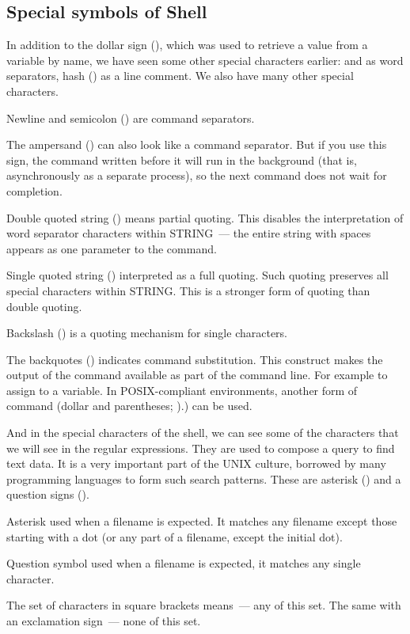 \subsection*{Special symbols of Shell}

In addition to the dollar sign (\struct{\textdollar}), which was used
to retrieve a value from a variable by name, we have seen some other special
characters earlier:  and  as word separators,
hash (\struct{\#}) as a line comment. We also have many other special characters.

Newline and semicolon (\struct{;}) are command separators.

The ampersand (\struct{\&}) can also look like a command separator.
But if you use this sign, the command written before it will run in
the background (that is, asynchronously as a separate process),
so the next command does not wait for completion.

Double quoted string () means partial
quoting. This disables the interpretation of word separator characters within
STRING~--- the entire string with spaces appears as one parameter to the command.

Single quoted string () interpreted as a full quoting.
Such quoting preserves all special characters within STRING.
This is a stronger form of quoting than double quoting.

Backslash (\struct{\textbackslash}) is a quoting mechanism for single characters.

The backquotes (\struct{\textasciigrave}) indicates command substitution.
This construct makes the output of the command available as part of
the command line. For example to assign to a variable. In POSIX-compliant
environments, another form of command (dollar and parentheses;
\struct{\$(\ldots)}).) can be used.

And in the special characters of the shell, we can see some of the characters
that we will see in the regular expressions. They are used to compose
a query to find text data. It is a very important part of the UNIX culture,
borrowed by many programming languages to form such search patterns.
These are asterisk (\struct{*}) and a question signs ().

Asterisk used when a filename is expected. It matches any filename except
those starting with a dot (or any part of a filename, except the initial dot).

Question symbol used when a filename is expected, it matches any single
character.

The set of characters in square brackets means~--- any of this set.
The same with an exclamation sign~--- none of this set.
